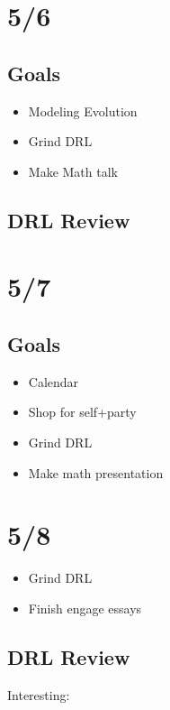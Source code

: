 \documentclass[11pt]{article}
\theoremstyle{remark}
\begin{document}
\section{5/6}

\subsection{Goals}

\begin{itemize}
	\item Modeling Evolution
	\item Grind DRL
	\item Make Math talk
\end{itemize}

\subsection{DRL Review}

\section{5/7}

\subsection{Goals}

\begin{itemize}
	\item Calendar
	\item Shop for self+party
	\item Grind DRL
	\item Make math presentation
\end{itemize}

\section{5/8}

\begin{itemize}
	\item Grind DRL
	\item Finish engage essays
\end{itemize}

\subsection{DRL Review}

Interesting:
\end{document}
